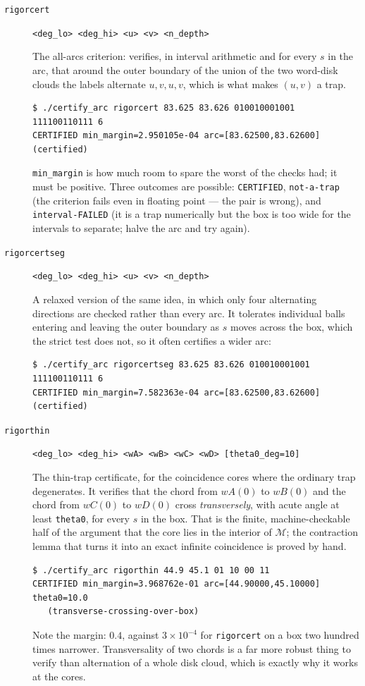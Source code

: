 \documentclass{amsart}
\begin{document}
\begin{description}
\item[\texttt{rigorcert}] \texttt{<deg\_lo> <deg\_hi> <u> <v> <n\_depth>}


The all-arcs criterion: verifies, in interval arithmetic and for every $s$ in the arc, that around
the outer boundary of the union of the two word-disk clouds the labels alternate $u,v,u,v$, which
is what makes $(u,v)$ a trap.
\begin{verbatim}
$ ./certify_arc rigorcert 83.625 83.626 010010001001 111100110111 6
CERTIFIED min_margin=2.950105e-04 arc=[83.62500,83.62600] (certified)
\end{verbatim}
\texttt{min\_margin} is how much room to spare the worst of the checks had; it must be positive.
Three outcomes are possible: \texttt{CERTIFIED}, \texttt{not-a-trap} (the criterion fails even in
floating point --- the pair is wrong), and \texttt{interval-FAILED} (it is a trap numerically but
the box is too wide for the intervals to separate; halve the arc and try again).
\item[\texttt{rigorcertseg}] \texttt{<deg\_lo> <deg\_hi> <u> <v> <n\_depth>}


A relaxed version of the same idea, in which only four alternating directions are checked rather
than every arc.  It tolerates individual balls entering and leaving the outer boundary as $s$
moves across the box, which the strict test does not, so it often certifies a wider arc:
\begin{verbatim}
$ ./certify_arc rigorcertseg 83.625 83.626 010010001001 111100110111 6
CERTIFIED min_margin=7.582363e-04 arc=[83.62500,83.62600] (certified)
\end{verbatim}
\item[\texttt{rigorthin}] \texttt{<deg\_lo> <deg\_hi> <wA> <wB> <wC> <wD> [theta0\_deg=10]}


The thin-trap certificate, for the coincidence cores where the ordinary trap degenerates.  It
verifies that the chord from $wA(0)$ to $wB(0)$ and the chord from $wC(0)$ to $wD(0)$ cross
\emph{transversely}, with acute angle at least \texttt{theta0}, for every $s$ in the box.  That is
the finite, machine-checkable half of the argument that the core lies in the interior of
$\mathcal{M}$; the contraction lemma that turns it into an exact infinite coincidence is proved by
hand.
\begin{verbatim}
$ ./certify_arc rigorthin 44.9 45.1 01 10 00 11
CERTIFIED min_margin=3.968762e-01 arc=[44.90000,45.10000] theta0=10.0
   (transverse-crossing-over-box)
\end{verbatim}
Note the margin: $0.4$, against $3 \times 10^{-4}$ for \texttt{rigorcert} on a box two hundred
times narrower.  Transversality of two chords is a far more robust thing to verify than
alternation of a whole disk cloud, which is exactly why it works at the cores.
\end{description}
\end{document}
